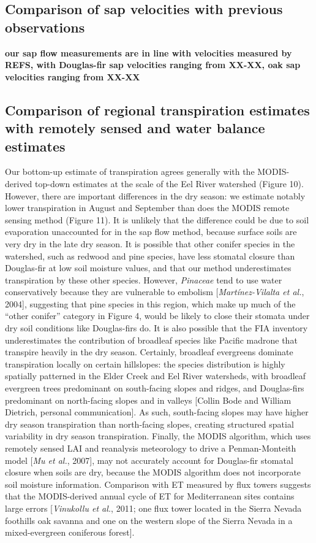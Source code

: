 \subsection{Comparison of sap velocities with previous observations}
\textbf{our sap flow measurements are in line with velocities measured by REFS, with Douglas-fir sap velocities ranging from XX-XX, oak sap velocities ranging from XX-XX}

\subsection{Comparison of regional transpiration estimates with remotely sensed and water balance estimates}
Our bottom-up estimate of transpiration agrees generally with the MODIS-derived top-down estimates at the scale of the Eel River watershed (Figure 10).  However, there are important differences in the dry season: we estimate notably lower transpiration in August and September than does the MODIS remote sensing method (Figure 11).  It is unlikely that the difference could be due to soil evaporation unaccounted for in the sap flow method, because surface soils are very dry in the late dry season.  It is possible that other conifer species in the watershed, such as redwood and pine species, have less stomatal closure than Douglas-fir at low soil moisture values, and that our method underestimates transpiration by these other species.  However, \textit{Pinaceae} tend to use water conservatively because they are vulnerable to embolism [\textit{Mart\'inez-Vilalta et al.}, 2004], suggesting that pine species in this region, which make up much of the ``other conifer'' category in Figure 4, would be likely to close their stomata under dry soil conditions like Douglas-firs do.  It is also possible that the FIA inventory underestimates the contribution of broadleaf species like Pacific madrone that transpire heavily in the dry season.  Certainly, broadleaf evergreens dominate transpiration locally on certain hillslopes: the species distribution is highly spatially patterned in the Elder Creek and Eel River watersheds, with broadleaf evergreen trees predominant on south-facing slopes and ridges, and Douglas-firs predominant on north-facing slopes and in valleys [Collin Bode and William Dietrich, personal communication].  As such, south-facing slopes may have higher dry season transpiration than north-facing slopes, creating structured spatial variability in dry season transpiration.  Finally, the MODIS algorithm, which uses remotely sensed LAI and reanalysis meteorology to drive a Penman-Monteith model [\textit{Mu et al.}, 2007], may not accurately account for Douglas-fir stomatal closure when soils are dry, because the MODIS algorithm does not incorporate soil moisture information.  Comparison with ET measured by flux towers suggests that the MODIS-derived annual cycle of ET for Mediterranean sites contains large errors [\textit{Vinukollu et al.}, 2011; one flux tower located in the Sierra Nevada foothills oak savanna and one on the western slope of the Sierra Nevada in a mixed-evergreen coniferous forest].


